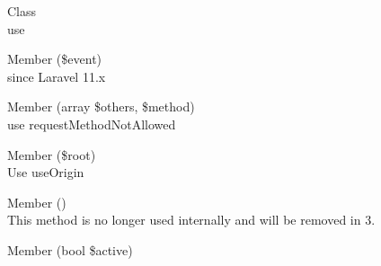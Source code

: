 \begin{DoxyRefList}
\item[Class \doxylink{class_illuminate_1_1_foundation_1_1_vite_manifest_not_found_exception}{Illuminate\textbackslash{}Foundation\textbackslash{}Vite\+Manifest\+Not\+Found\+Exception} ]\hfill \\
\label{deprecated__deprecated000062}%
%
use   
\item[Member \doxylink{class_illuminate_1_1_redis_1_1_connections_1_1_connection_ab74927712804eab6f2f862f36987a09d}{Illuminate\textbackslash{}Redis\textbackslash{}Connections\textbackslash{}Connection\+::event} (\$event)]\hfill \\
\label{deprecated__deprecated000064}%
%
since Laravel 11.\+x  
\item[Member \doxylink{class_illuminate_1_1_routing_1_1_abstract_route_collection_a4138be18b2f18b736688a78070723e88}{Illuminate\textbackslash{}Routing\textbackslash{}Abstract\+Route\+Collection\+::method\+Not\+Allowed} (array \$others, \$method)]\hfill \\
\label{deprecated__deprecated000065}%
%
use request\+Method\+Not\+Allowed 
\item[Member \doxylink{class_illuminate_1_1_routing_1_1_url_generator_aada7314435134e73319b30ae210f2e30}{Illuminate\textbackslash{}Routing\textbackslash{}Url\+Generator\+::force\+Root\+Url} (\$root)]\hfill \\
\label{deprecated__deprecated000067}%
%
Use use\+Origin  
\item[Member \doxylink{interface_league_1_1_common_mark_1_1_delimiter_1_1_delimiter_interface_a02dec41e2551447646696367f136b971}{League\textbackslash{}Common\+Mark\textbackslash{}Delimiter\textbackslash{}Delimiter\+Interface\+::is\+Active} ()]\hfill \\
\label{deprecated__deprecated000068}%
%
This method is no longer used internally and will be removed in 3.  
\item[Member \doxylink{interface_league_1_1_common_mark_1_1_delimiter_1_1_delimiter_interface_a151a21ee6b365a37065c6a4ba19f1a10}{League\textbackslash{}Common\+Mark\textbackslash{}Delimiter\textbackslash{}Delimiter\+Interface\+::set\+Active} (bool \$active)]\hfill \\
\label{deprecated__deprecated000069}%
%

\end{DoxyRefList}

